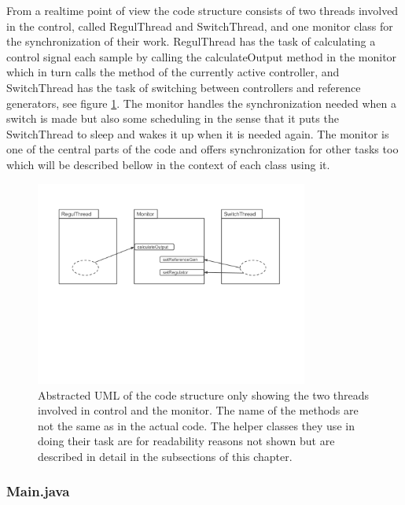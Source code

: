 
From a realtime point of view the code structure consists of two threads involved in the control, called RegulThread and SwitchThread, and one monitor class for the synchronization of their work. RegulThread has the task of calculating a control signal each sample by calling the calculateOutput method in the monitor which in turn calls the method of the currently active controller, and SwitchThread has the task of switching between controllers and reference generators, see figure \ref{overall_fig}. The monitor handles the synchronization needed when a switch is made but also some scheduling in the sense that it puts the SwitchThread to sleep and wakes it up when it is needed again. The monitor is one of the central parts of the code and offers synchronization for other tasks too which will be described bellow in the context of each class using it. 
\begin{figure}
\centering
\includegraphics[width=0.8\textwidth]{figures/Overall.png}
\caption{Abstracted UML of the code structure only showing the two threads involved in control and the  monitor. The name of the methods are not the same as in the actual code. The helper classes they use in doing their
task are for readability reasons not shown but are described in detail in the subsections of this chapter.}
\label{overall_fig}
\end{figure}

\subsubsection{Main.java}

